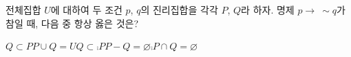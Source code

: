 전체집합 $U$에 대하여 두 조건 $p$, $q$의 진리집합을 각각 $P$, $Q$라 하자. 명제 $p\longrightarrow\ \sim q$가 참일 때, 다음 중 항상 옳은 것은?
\begin{choices32}{$Q\subset P$}{$P\cup Q=U$}{$Q\subset\comp{P}$}{$P-Q=\varnothing$}{$\comp{P}\cap Q=\varnothing$}\end{choices32}
